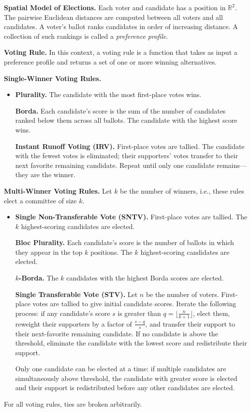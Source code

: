 \begingroup

\setlength{\parskip}{0.5em}
\setlength{\parindent}{0em}

\textbf{Spatial Model of Elections.}
Each voter and candidate has a position in $\mathbb{R}^2$.
The pairwise Euclidean distances are computed between
all voters and all candidates.
A voter's ballot ranks candidates in order of increasing distance.
A collection of such rankings is called a \textit{preference profile}.

\textbf{Voting Rule.}
In this context, a voting rule is a function that takes as input a preference profile
and returns a set of one or more winning alternatives.

\textbf{Single-Winner Voting Rules.}

\begin{itemize}[topsep=0em]
\item[]
\textbf{Plurality.}
The candidate with the most first-place votes wins.

\textbf{Borda.}
Each candidate's score is the sum of the number of candidates ranked below them across all ballots.
The candidate with the highest score wins.

\textbf{Instant Runoff Voting (IRV).}
First-place votes are tallied.
The candidate with the fewest votes is eliminated;
their supporters' votes transfer to their next favorite remaining candidate.
Repeat until only one candidate remains---they are the winner.

\end{itemize}

\textbf{Multi-Winner Voting Rules.} Let $k$ be the number of winners, i.e.,
these rules elect a committee of size $k$.

\begin{itemize}[topsep=0em]
  \item[]
  \textbf{Single Non-Transferable Vote (SNTV).}
  First-place votes are tallied.
  The $k$ highest-scoring candidates are elected.

  \textbf{Bloc Plurality.}
  Each candidate's score is the number of ballots in which
  they appear in the top $k$ positions.
  The $k$ highest-scoring candidates are elected.

  \textbf{$k$-Borda.}
  The $k$ candidates with the highest Borda scores are elected.

  \textbf{Single Transferable Vote (STV).}
  Let $n$ be the number of voters.
  First-place votes are tallied to give initial candidate scores.
  Iterate the following process:
  if any candidate's score $s$ is greater than
  $ q = \lfloor \frac{n}{k+1} \rfloor $, elect them,
  reweight their supporters by a factor of $\frac{s-q}{s}$,
  and transfer their support to their next-favorite remaining candidate.
  If no candidate is above the threshold, eliminate the candidate
  with the lowest score and redistribute their support.

  Only one candidate can be elected at a time:
  if multiple candidates are simultaneously above threshold,
  the candidate with greater score is elected
  and their support is redistributed before any other candidates are elected.

\end{itemize}

For all voting rules, ties are broken arbitrarily.

\endgroup
